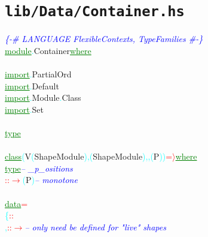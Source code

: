 \section{\texttt{lib/Data/Container.hs}}
\label{mod:Data.Container}
\textcolor{blue}{{\it{}\{-\# LANGUAGE FlexibleContexts, TypeFamilies \#-\}}}\\\textcolor{green}{\underline{module}}\textcolor{cyan}{.}{\rm{}Container}\hsspace \textcolor{green}{\underline{where}}\\\\\textcolor{green}{\underline{import}}\textcolor{cyan}{.}{\rm{}PartialOrd}\\\textcolor{green}{\underline{import}}\textcolor{cyan}{.}{\rm{}Default}\\\textcolor{green}{\underline{import}}\textcolor{cyan}{.}{\rm{}Module}\textcolor{cyan}{.}{\rm{}Class}\\\textcolor{green}{\underline{import}}\textcolor{cyan}{.}{\rm{}Set}\\\\\textcolor{green}{\underline{type}}\\\\\textcolor{green}{\underline{class}}\hsspace \textcolor{cyan}{(}{\rm{}V}\hsspace \textcolor{cyan}{(}{\rm{}ShapeModule}\textcolor{cyan}{)}\hsspace \textcolor{red}{\tilde{ }}\textcolor{cyan}{,}\hsspace \textcolor{cyan}{(}{\rm{}ShapeModule}\textcolor{cyan}{)}\textcolor{cyan}{,}\textcolor{cyan}{,}\hsspace \textcolor{cyan}{(}{\rm{}P}\textcolor{cyan}{)}\textcolor{cyan}{)}\hsspace \textcolor{red}{=\ensuremath{\rangle}}\hsspace \textcolor{green}{\underline{where}}\\\hstab \textcolor{green}{\underline{type}}\hsspace \textcolor{blue}{{\it{}-- \_p\_ositions}}\\\hsspace \textcolor{red}{::}\hsspace \textcolor{red}{\ensuremath{\rightarrow}}\hsspace \textcolor{cyan}{(}{\rm{}P}\textcolor{cyan}{)}\hsspace \textcolor{blue}{{\it{}-- monotone}}\\\\\textcolor{green}{\underline{data}}\hsspace \textcolor{red}{=}\\\hstab \textcolor{cyan}{\{}\hsspace \hsspace \hsspace \hsspace \textcolor{red}{::}\\\hstab \textcolor{cyan}{,}\hsspace \textcolor{red}{::}\hsspace \textcolor{red}{\ensuremath{\rightarrow}}\hsspace \textcolor{blue}{{\it{}-- only need be defined for "live" shapes}}\\\hstab 
